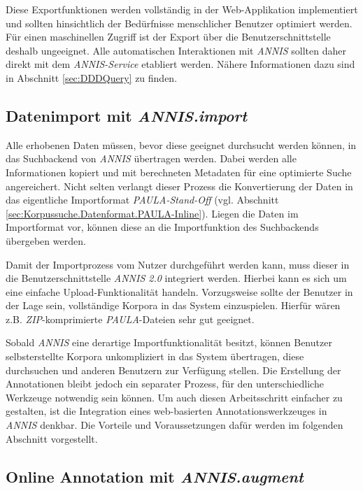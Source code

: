 Diese Exportfunktionen werden vollständig in der Web-Applikation implementiert und sollten hinsichtlich der Bedürfnisse menschlicher Benutzer optimiert werden. Für einen maschinellen Zugriff ist der Export über die Benutzerschnittstelle deshalb ungeeignet. Alle automatischen Interaktionen mit \emph{ANNIS} sollten daher direkt mit dem \emph{ANNIS-Service} etabliert werden. Nähere Informationen dazu sind in Abschnitt \ref{sec:DDDQuery} zu finden.

\subsection{Datenimport mit \emph{ANNIS.import}}

Alle erhobenen Daten müssen, bevor diese geeignet durchsucht werden können, in das Suchbackend von \emph{ANNIS} übertragen werden. Dabei werden alle Informationen kopiert und mit berechneten Metadaten für eine optimierte Suche angereichert. Nicht selten verlangt dieser Prozess die Konvertierung der Daten in das eigentliche Importformat \emph{PAULA-Stand-Off} (vgl. Abschnitt \ref{sec:Korpussuche.Datenformat.PAULA-Inline}). Liegen die Daten im Importformat vor, können diese an die Importfunktion des Suchbackends übergeben werden.

Damit der Importprozess vom Nutzer durchgeführt werden kann, muss dieser in die Benutzerschnittstelle \emph{ANNIS 2.0} integriert werden. Hierbei kann es sich um eine einfache Upload-Funktionalität handeln. Vorzugsweise sollte der Benutzer in der Lage sein, vollständige Korpora in das System einzuspielen. Hierfür wären z.B. \emph{ZIP}-komprimierte \emph{PAULA}-Dateien sehr gut geeignet.

Sobald \emph{ANNIS} eine derartige Importfunktionalität besitzt, können Benutzer selbsterstellte Korpora unkompliziert in das System übertragen, diese durchsuchen und anderen Benutzern zur Verfügung stellen. Die Erstellung der Annotationen bleibt jedoch ein separater Prozess, für den unterschiedliche Werkzeuge notwendig sein können. Um auch diesen Arbeitsschritt einfacher zu gestalten, ist die Integration eines web-basierten Annotationswerkzeuges in \emph{ANNIS} denkbar. Die Vorteile und Voraussetzungen dafür werden im folgenden Abschnitt vorgestellt.

\subsection{Online Annotation mit \emph{ANNIS.augment}}

